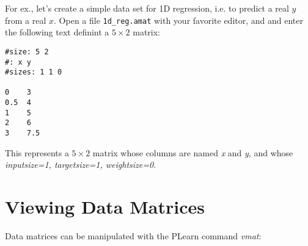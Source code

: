 \documentclass[11pt]{book}
\begin{document}
For ex., let's create a simple data set for 1D regression, i.e. to predict a real $y$ from a real $x$.
Open a file \verb!1d_reg.amat! with your favorite editor, and and enter the following text definint a 
$5 \times 2$ matrix:
\begin{verbatim}
#size: 5 2
#: x y     
#sizes: 1 1 0

0    3
0.5  4
1    5
2    6
3    7.5
\end{verbatim}

This represents a $5 \times 2$ matrix whose columns are named {\em x} and
{\em y}, and whose {\em inputsize=1, targetsize=1, weightsize=0}.

\section{Viewing Data Matrices}

Data matrices can be manipulated with the PLearn command {\em vmat}:
\end{document}
